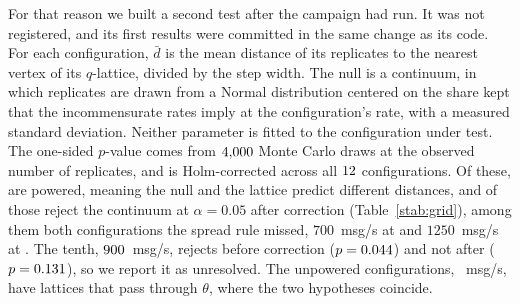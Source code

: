\documentclass[10pt,journal,onecolumn]{IEEEtran}
\begin{document}
For that reason we built a second test after the campaign had run. It was not registered, and its
first results were committed in the same change as its code. For each configuration, $\bar{d}$ is
the mean distance of its replicates to the nearest vertex of its $q$-lattice, divided by the step
width. The null is a continuum, in which replicates are drawn from a Normal distribution centered on
the share kept that the incommensurate rates imply at the configuration's rate, with a measured standard
deviation. Neither parameter is fitted to the configuration under test. The one-sided $p$-value
comes from $\gridDraws$ Monte Carlo draws at the observed number of replicates, and is
Holm-corrected across all $\gridArms$ configurations. Of these, \gridPoweredWord{} are powered,
meaning the null and the lattice predict different distances, and \gridRejectWord{} of those reject
the continuum at $\alpha = 0.05$ after correction (Table~\ref{stab:grid}), among them both
configurations the spread rule missed, $700$~msg/s at \pgridSevenHundred{} and $1250$~msg/s at
\pgridTwelveFifty{}. The tenth, $900$~msg/s, rejects before correction
($p = 0.044$) and not after ($p = 0.131$), so we report it as
unresolved. The \gridFlatWord{} unpowered configurations, \gridFlatRates~msg/s, have lattices that
pass through $\theta$, where the two hypotheses coincide.

\begin{table}[tb]
\caption{\textbf{Shares kept sit on the $q$-lattice in \gridRejectWord{} of the \gridPoweredWord{} powered
configurations, tested against a continuum null.} Here $\bar{d}$ is the mean normalized distance to
the nearest vertex, and the null column is its mean under the simulated null. The column
$p_{\mathrm{Holm}}$ is a Monte Carlo $p$-value ($\gridDraws$ draws), Holm-corrected within all
$\gridArms$ configurations; it decides the verdict. Flat (coincident) marks configurations where
the two hypotheses predict alike and the test has no power.}
\label{stab:grid}
\footnotesize
\centering
\setlength{\tabcolsep}{4pt}

\end{table}
\end{document}
